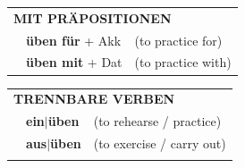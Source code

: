 \documentclass[10pt,a4paper]{revtex4-2}
\begin{document}
\begin{verbbox}
   \vspace{10pt}

   \begin{tabular}{lll}
      \multicolumn{3}{l}{\textbf{MIT PRÄPOSITIONEN}}\\
& \textbf{üben für} + Akk & (to practice for)\\
& \textbf{üben mit} + Dat & (to practice with)\\
\end{tabular}
  \hfill
   \begin{tabular}{lll}
      \multicolumn{3}{l}{\textbf{TRENNBARE VERBEN}}\\
 & \textbf{ein$|$üben} & (to rehearse / practice)\\
 & \textbf{aus$|$üben} & (to exercise / carry out)\\
\vspace{10pt}
  \end{tabular}

  \vspace{-5pt}

\end{verbbox}
\end{document}
